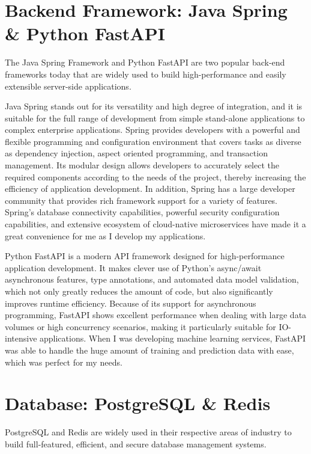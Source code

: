 \documentclass[12pt,two side]{report}
\begin{document}
\section{Backend Framework: Java Spring\cite{SpringFramework} \& Python FastAPI}
The Java Spring Framework and Python FastAPI are two popular back-end frameworks today that are widely used to build high-performance and easily extensible server-side applications.\newline

Java Spring stands out for its versatility and high degree of integration, and it is suitable for the full range of development from simple stand-alone applications to complex enterprise applications. Spring provides developers with a powerful and flexible programming and configuration environment that covers tasks as diverse as dependency injection, aspect oriented programming, and transaction management. Its modular design allows developers to accurately select the required components according to the needs of the project, thereby increasing the efficiency of application development. In addition, Spring has a large developer community that provides rich framework support for a variety of features. Spring's database connectivity capabilities, powerful security configuration capabilities, and extensive ecosystem of cloud-native microservices have made it a great convenience for me as I develop my applications.\newline

Python FastAPI is a modern API framework designed for high-performance application development. It makes clever use of Python's async/await asynchronous features, type annotations, and automated data model validation, which not only greatly reduces the amount of code, but also significantly improves runtime efficiency. Because of its support for asynchronous programming, FastAPI shows excellent performance when dealing with large data volumes or high concurrency scenarios, making it particularly suitable for IO-intensive applications. When I was developing machine learning services, FastAPI was able to handle the huge amount of training and prediction data with ease, which was perfect for my needs.

\section{Database: PostgreSQL \& Redis}
PostgreSQL and Redis are widely used in their respective areas of industry to build full-featured, efficient, and secure database management systems.\newline
\end{document}
